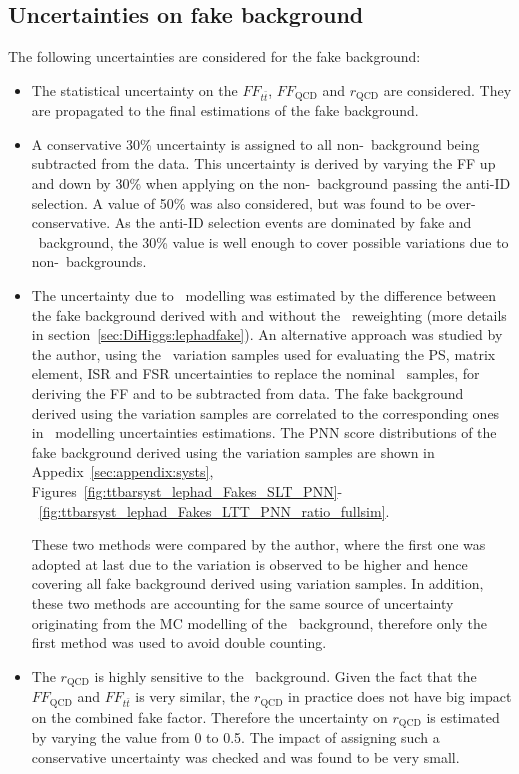 \subsection{Uncertainties on fake background}
\label{sec:DiHiggs:fakesyst}
The following uncertainties are considered
for the fake background:
\begin{itemize}
  \item The statistical uncertainty on the $FF_{t\bar{t}}$, 
  $FF_\text{QCD}$ and $r_\text{QCD}$ are considered. They are
  propagated to the final estimations of the fake background.
  \item A conservative 30\% uncertainty is assigned to all non-\ttbar\
  background being subtracted from the data. This uncertainty is derived
  by varying the FF up and down by 30\% when applying on the non-\ttbar\ background
  passing the anti-ID selection. 
  A value of 50\% was also considered, but was found to be over-conservative.
  As the anti-ID selection events are dominated by fake and \ttbar\ background,
  the 30\% value is well enough to cover possible variations due to non-\ttbar\ backgrounds.  
  \item The uncertainty due to \ttbar\ modelling was estimated by the 
  difference between the fake background derived with and without the 
  \ttbar\ reweighting (more details in section~\ref{sec:DiHiggs:lephadfake}).
  An alternative approach was studied by the author, using the \ttbar\ variation samples
  used for evaluating the PS, matrix element, ISR and FSR uncertainties to replace the nominal \ttbar\ 
  samples, for deriving the FF and to be subtracted from data. The fake background derived
  using the variation samples are correlated to the corresponding ones in \ttbar\ modelling 
  uncertainties estimations. 
  The PNN score distributions of the fake background derived using the variation samples 
  are shown in Appedix~\ref{sec:appendix:systs}, Figures~\ref{fig:ttbarsyst_lephad_Fakes_SLT_PNN}-~\ref{fig:ttbarsyst_lephad_Fakes_LTT_PNN_ratio_fullsim}.
  
  These two methods were compared by the author, where the first one was adopted at last
  due to the variation is observed to be higher and hence covering all fake background derived
  using variation samples. In addition, these two methods are accounting for the same source
  of uncertainty originating from the MC modelling of the \ttbar\ background, therefore
  only the first method was used to avoid double counting. 
  \item  The $r_\text{QCD}$ is highly sensitive to the \ttbar\ background. 
  Given the fact that the $FF_\text{QCD}$ and $FF_{t\bar{t}}$ is very similar, 
  the $r_\text{QCD}$ in practice does not have big impact on the combined fake factor. 
  Therefore the uncertainty on $r_\text{QCD}$ is estimated by varying the value from 0 to 0.5. 
  The impact of assigning such a conservative uncertainty was checked and was found to be
  very small. 
   
\end{itemize}
